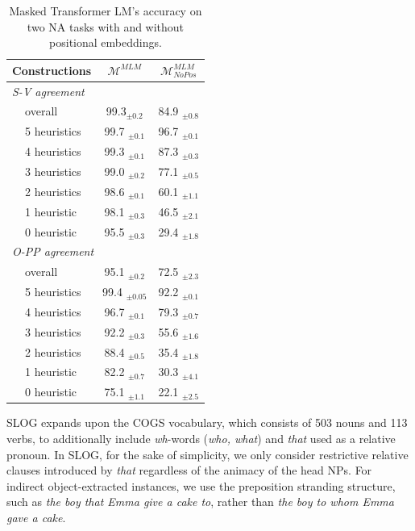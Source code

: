 \begin{table}[ht]
  \centering
  \begin{tabular}{llcc}
    \toprule
    \multicolumn{2}{l}{Constructions}  &$\mathcal{M}^{MLM}$ & $\mathcal{M}_{NoPos}^{MLM}$ \\
    \midrule
    \multicolumn{4}{l}{\textit{S-V agreement}} \\
    \phantom{ab} & overall  & 99.3$_{\pm 0.2}$   & 84.9 $_{\pm 0.8}$ \\\cline{2-4}
    \phantom{ab} & 5 heuristics  &99.7 $_{\pm 0.1}$ & 96.7 $_{\pm 0.1}$ \\
    \phantom{ab} & 4 heuristics  &99.3 $_{\pm 0.1}$ & 87.3 $_{\pm 0.3}$ \\
    \phantom{ab} & 3 heuristics  & 99.0 $_{\pm 0.2}$ & 77.1 $_{\pm 0.5}$\\
    \phantom{ab} & 2 heuristics  & 98.6 $_{\pm 0.1}$& 60.1 $_{\pm 1.1}$\\    
    \phantom{ab} & 1 heuristic &98.1 $_{\pm 0.3}$& 46.5 $_{\pm 2.1}$\\
    \phantom{ab} & 0 heuristic &95.5 $_{\pm 0.3}$ & 29.4 $_{\pm 1.8}$\\
    \midrule
    \multicolumn{4}{l}{\textit{O-PP agreement}} \\
     & overall  & 95.1 $_{\pm 0.2}$  & 72.5 $_{\pm 2.3}$     \\\cline{2-4}
      & 5 heuristics  &99.4 $_{\pm 0.05}$ & 92.2 $_{\pm 0.1}$ \\
     & 4 heuristics  &96.7 $_{\pm 0.1}$ & 79.3 $_{\pm 0.7}$\\
     & 3 heuristics  & 92.2 $_{\pm 0.3}$& 55.6 $_{\pm 1.6}$\\
     & 2 heuristics  & 88.4 $_{\pm 0.5}$& 35.4 $_{\pm 1.8}$\\    
     & 1 heuristic &82.2 $_{\pm 0.7}$& 30.3  $_{\pm 4.1}$ \\
     & 0 heuristic  &75.1 $_{\pm 1.1}$& 22.1 $_{\pm 2.5}$\\
    \bottomrule
  \end{tabular}
\caption{Masked Transformer LM's accuracy on two NA tasks with and without positional embeddings. \label{tab:MLM_nopos}
}
\end{table}

\clearpage

 \label{app:dataset-generation}

SLOG expands upon the COGS vocabulary, which consists of 503 nouns and 113 verbs, to additionally include \textit{wh}-words (\textit{who, what}) and \textit{that} used as a relative pronoun. In SLOG, for the sake of simplicity, we only consider restrictive relative clauses introduced by \textit{that} regardless of the animacy of the head NPs. For indirect object-extracted instances, we use the preposition stranding structure, such as \textit{the boy that Emma give a cake to}, rather than \textit{the boy to whom Emma gave a cake}.

